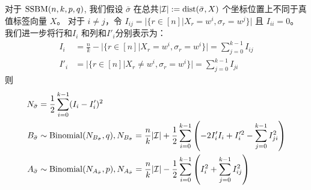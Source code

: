 \begin{lemma}\label{lem:minus}
	对于 $\operatorname{SSBM}(n,k,p,q)$,
  我们假设 $\bar{\sigma}$ 
  在总共$|\mathcal{I}|:=\operatorname{dist}(\bar{\sigma}, X)$ 
  个坐标位置上不同于真值标签向量
  $X$。
	对于 $i\neq j$，令 $I_{ij} = \Big|\{r\in [n] \big| X_r = w^i, \sigma_r = w^j \}\Big|$
  且 $I_{ii} = 0$。
  我们进一步将行和$I_i$
  和列和$I'_i$分别表示为：
  \begin{align}
  I_i &= \frac{n}{k} -
  \Big|\{r\in [n] \big| X_r = w^i, \sigma_r=w^i \}\Big|
  =
  \sum_{j=0}^{k-1} I_{ij} \label{eq:I_i_horizontal} \\
  I'_i &=
  \Big|\{r\in [n] \big| X_r \neq w^i,
  \sigma_r=w^i \}\Big|
  =\sum_{j=0}^{k-1} I_{ji}\label{eq:I_prime_i_vertical}
  \end{align}
	则
\begin{align}
	N_{\bar{\sigma}} &= \frac{1}{2}\sum_{i=0}^{k-1} (I_i - I_i')^2 \label{eq:N_w} \\
	B_{\bar{\sigma}} & \sim \operatorname{Binomial}(N_{B_{\bar{\sigma}}} , q),
  N_{B_{\bar{\sigma}}}=\frac{n}{k}|\mathcal{I}| + \frac{1}{2}\sum_{i=0}^{k-1}  
  \left(-2 I'_i I_i  + I'^2_i - \sum_{j=0}^{k-1} I^2_{ji} \right)
  \label{eq:B_w}\\
	A_{\bar{\sigma}} &
  \sim \operatorname{Binomial}(N_{A_{\bar{\sigma}}}, p),
  N_{A_{\bar{\sigma}}}=
  \frac{n}{k}|\mathcal{I}| - \frac{1}{2}\sum_{i=0}^{k-1}
   \left(I^2_i + \sum_{j=0}^{k-1} I^2_{ij} \right)
  \label{eq:A_w}
	\end{align}
\end{lemma}
